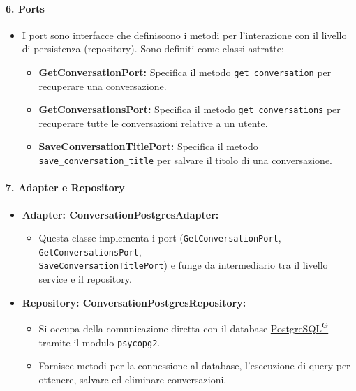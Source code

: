     \paragraph{6. Ports}
    \begin{itemize}
        \item I port sono interfacce che definiscono i metodi per l'interazione con il livello di persistenza (repository). Sono definiti come classi astratte:
        \begin{itemize}
            \item \textbf{GetConversationPort:} Specifica il metodo \texttt{get\_conversation} per recuperare una conversazione.
            \item \textbf{GetConversationsPort:} Specifica il metodo \texttt{get\_conversations} per recuperare tutte le conversazioni relative a un utente.
            \item \textbf{SaveConversationTitlePort:} Specifica il metodo \texttt{save\_conversation\_title} per salvare il titolo di una conversazione.
        \end{itemize}
    \end{itemize}

    \paragraph{7. Adapter e Repository}
    \begin{itemize}
        \item \textbf{Adapter: ConversationPostgresAdapter:}
        \begin{itemize}
            \item Questa classe implementa i port (\texttt{GetConversationPort}, \texttt{GetConversationsPort}, \\ 
            \texttt{SaveConversationTitlePort}) e funge da intermediario tra il livello service e il repository.
        \end{itemize}
        \item \textbf{Repository: ConversationPostgresRepository:}
        \begin{itemize}
            \item Si occupa della comunicazione diretta con il database \href{https://code7crusaders.github.io/docs/PB/documentazione_interna/glossario.html#postgresql}{PostgreSQL\textsuperscript{G}} tramite il modulo \texttt{psycopg2}.
            \item Fornisce metodi per la connessione al database, l'esecuzione di query per ottenere, salvare ed eliminare conversazioni.
        \end{itemize}
    \end{itemize}


